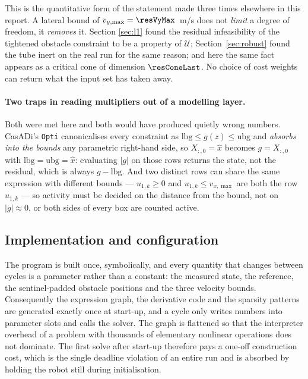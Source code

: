 \documentclass[11pt,a4paper]{article}
\begin{document}
This is the quantitative form of the statement made three times elsewhere in this report. A lateral bound of
$v_{y,\max}=\resVyMax$~m/s does not \emph{limit} a degree of freedom, it \emph{removes} it. Section
\ref{sec:l1} found the residual infeasibility of the tightened obstacle constraint to be a property of
$\mathcal{U}$; Section~\ref{sec:robust} found the tube inert on the real run for the same reason; and here
the same fact appears as a critical cone of dimension $\resConeLast$. No choice of cost weights can return
what the input set has taken away.

\paragraph{Two traps in reading multipliers out of a modelling layer.} Both were met here and both would have
produced quietly wrong numbers. CasADi's \texttt{Opti} canonicalises every constraint as
$\mathrm{lbg}\le g(z)\le\mathrm{ubg}$ and \emph{absorbs into the bounds} any parametric right-hand side, so
$X_{:,0}=\hat x$ becomes $g=X_{:,0}$ with $\mathrm{lbg}=\mathrm{ubg}=\hat x$: evaluating $|g|$ on those rows
returns the state, not the residual, which is always $g-\mathrm{lbg}$. And two distinct rows can share the
same expression with different bounds --- $u_{1,k}\ge0$ and $u_{1,k}\le v_{x,\max}$ are both the row
$u_{1,k}$ --- so activity must be decided on the distance from the bound, not on $|g|\approx0$, or both sides
of every box are counted active.

\subsection{Implementation and configuration}
\label{sec:impl}

The program is built once, symbolically, and every quantity that changes between cycles is a parameter rather
than a constant: the measured state, the reference, the sentinel-padded obstacle positions and the three
velocity bounds. Consequently the expression graph, the derivative code and the sparsity patterns are
generated exactly once at start-up, and a cycle only writes numbers into parameter slots and calls the
solver. The graph is flattened so that the interpreter overhead of a problem with thousands of elementary
nonlinear operations does not dominate. The first solve after start-up therefore pays a one-off construction
cost, which is the single deadline violation of an entire run and is absorbed by holding the robot still
during initialisation.
\end{document}
